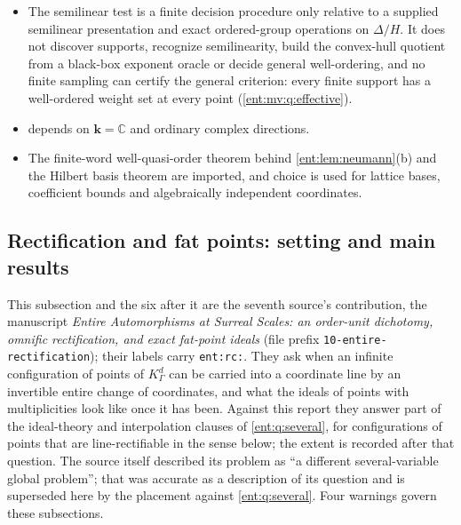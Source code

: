 \documentclass[11pt]{article}
\theoremstyle{plain}
\theoremstyle{plain}
\theoremstyle{plain}
\theoremstyle{definition}
\theoremstyle{definition}
\theoremstyle{definition}
\theoremstyle{definition}
\theoremstyle{remark}
\newcommand{\C}{\mathbb C}\newcommand{\R}{\mathbb R}
\newcommand{\K}{K_\Gamma}\newcommand{\KD}{K_\Delta}
\newcommand{\kk}{\mathbf k}\newcommand{\PP}{\mathbb P}
\newcounter{entrcsaveeq}
\begin{document}
\begin{itemize}[leftmargin=1.4em]
full Hahn fields, and nothing is claimed for support-restricted or incomplete
subfields, where an ambient strong sum need not lie in the smaller field.
\item The semilinear test is a finite decision procedure only relative to a
supplied semilinear presentation and exact ordered-group operations on
$\Delta/H$. It does not discover supports, recognize semilinearity, build the
convex-hull quotient from a black-box exponent oracle or decide general
well-ordering, and no finite sampling can certify the general criterion:
every finite support has a well-ordered weight set at every point
(\cref{ent:mv:q:effective}).
\item {} depends on $\kk=\C$ and ordinary
complex directions.
\item The finite-word well-quasi-order theorem behind
\cref{ent:lem:neumann}(b) and the Hilbert basis theorem are imported, and
choice is used for lattice bases, coefficient bounds and algebraically
independent coordinates.
\end{itemize}

\begingroup
\setcounter{entrcsaveeq}{\value{equation}}%
\setcounter{equation}{0}%
\renewcommand{\theequation}{R\arabic{equation}}%
\renewcommand{\theHequation}{entrc.\arabic{equation}}%

\subsection{Rectification and fat points: setting and main results}
\label{ent:rc:subsec:setting}

This subsection and the six after it are the seventh source's contribution,
the manuscript \emph{Entire Automorphisms at Surreal Scales: an order-unit
dichotomy, omnific rectification, and exact fat-point ideals} (file prefix
\texttt{10-entire-rectification}); their labels carry \texttt{ent:rc:}. They
ask when an infinite configuration of points of $\K^d$ can be carried into a
coordinate line by an invertible entire change of coordinates, and what the
ideals of points with multiplicities look like once it has been. Against this
report they answer part of the ideal-theory and interpolation clauses of
\cref{ent:q:several}, for configurations of points that are line-rectifiable
in the sense below; the extent is recorded after that question. The source
itself described its problem as ``a different several-variable global
problem''; that was accurate as a description of its question and is
superseded here by the placement against \cref{ent:q:several}. Four warnings
govern these subsections.
\end{document}
